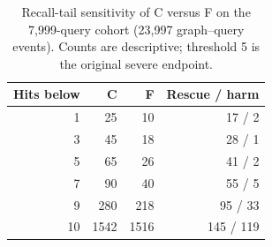 \begin{table}[t]
\centering
\caption{Recall-tail sensitivity of C versus F on the 7,999-query cohort (23,997 graph--query events). Counts are descriptive; threshold 5 is the original severe endpoint.}
\label{tab:thresholds}
\small
\begin{tabular}{@{}rrrr@{}}
\toprule
Hits below & C & F & Rescue / harm \\
\midrule
1 & 25 & 10 & 17 / 2 \\
3 & 45 & 18 & 28 / 1 \\
5 & 65 & 26 & 41 / 2 \\
7 & 90 & 40 & 55 / 5 \\
9 & 280 & 218 & 95 / 33 \\
10 & 1542 & 1516 & 145 / 119 \\
\bottomrule
\end{tabular}
\end{table}
